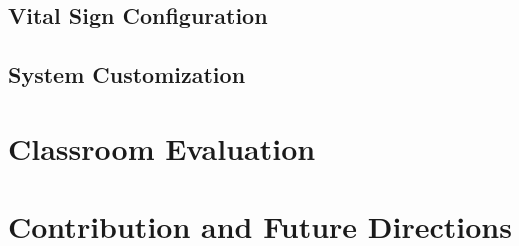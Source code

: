 \section{Vital Sign Configuration}
\label{SICUconfiguration}

\section{System Customization}
\label{SystemCustomization}

\chapter{Classroom Evaluation}

\chapter{Contribution and Future Directions}



